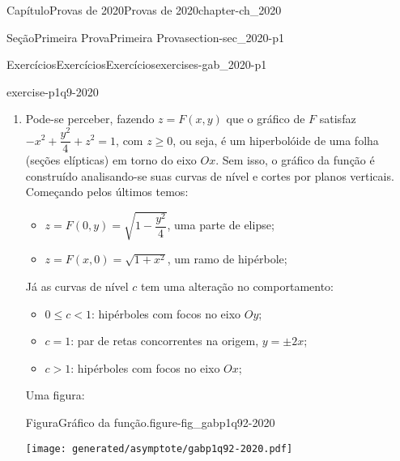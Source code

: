 \documentclass[oneside,10pt,]{book}
\numberwithin{equation}{section}
\newcommand{\R}{\mathbb R}
\begin{document}
\begin{chapterptx}{Capítulo}{Provas de 2020}{}{Provas de 2020}{}{}{chapter-ch_2020}
\begin{sectionptx}{Seção}{Primeira Prova}{}{Primeira Prova}{}{}{section-sec_2020-p1}
\begin{exercises-subsection-numberless}{Exercícios}{Exercícios}{}{Exercícios}{}{}{exercises-gab_2020-p1}
\begin{divisionexercise}{9}{}{}{exercise-p1q9-2020}
\begin{enumerate}[label=\alph*]
\begin{equation*}
r\colon (x,y)=\gamma(t_0)+\gamma\beta'(t_0)=(1,2\sqrt
{2})+\lambda(2,2\sqrt{2}),\lambda\in\R.
\end{equation*}
A equação geral de tal reta é \(r\colon
y=\sqrt{2}x+\sqrt{2}\).%
\item{}Pode-se perceber, fazendo \(z=F(x,y)\) que o gráfico de \(F\) satisfaz \(-x^2+\dfrac{y^2}{4}+z^2=1\), com \(z\geq 0\), ou seja, é um hiperbolóide de uma folha (seções elípticas) em torno do eixo \(Ox\). Sem isso, o gráfico da função é construído analisando-se suas curvas de nível e cortes por planos verticais. Começando pelos últimos temos:%
\begin{itemize}[label=\textbullet]
\item{}\(z=F(0,y)=\sqrt{1-\dfrac{y^2}{4}}\), uma parte de elipse;%
\item{}\(z=F(x,0)=\sqrt{1+x^2}\), um ramo de hipérbole;%
\end{itemize}
Já as curvas de nível \(c\) tem uma alteração no comportamento:%
\begin{itemize}[label=\textbullet]
\item{}\(0\leq c< 1\): hipérboles com focos no eixo \(Oy\);%
\item{}\(c=1\): par de retas concorrentes na origem, \(y=\pm 2x\);%
\item{}\(c> 1\): hipérboles com focos no eixo \(Ox\);%
\end{itemize}
%
\par
Uma figura: \begin{figureptx}{Figura}{Gráfico da função.}{figure-fig_gabp1q92-2020}{}%
\begin{image}{0.25}{0.5}{0.25}{}%
\texttt{[image: generated/asymptote/gabp1q92-2020.pdf]}
\end{image}%
\tcblower
\end{figureptx}%
%
\end{enumerate}
\end{divisionexercise}%
\end{exercises-subsection-numberless}
\end{sectionptx}
\end{chapterptx}
%
%
\typeout{************************************************}
\typeout{************************************************}
%
\end{document}
